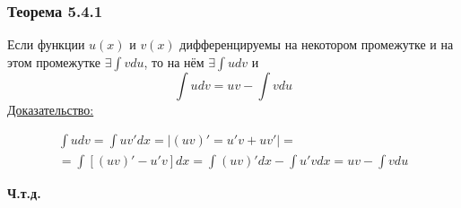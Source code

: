 \documentclass[12pt]{article}
\begin{document}
    \subsubsection*{Теорема 5.4.1}\label{th:5.4.1}
    Если функции $u(x)$ и $v(x)$ дифференцируемы на некотором промежутке и на этом промежутке $\exists \int vdu$, то на нём $\exists \int udv$ и
    \[ \boxed{\int udv = uv - \int vdu} \]
    \underline{Доказательство:}
    \begin{adjustwidth}{1.5em}{1.5em}
        \begin{gather*}
            \int udv = \int uv'dx = \left| (uv)' = u'v + uv' \right| =\\
            = \int [(uv)' - u'v]dx = \int (uv)'dx - \int u'vdx = uv - \int vdu
        \end{gather*}
        \begin{center}
            \textbf{Ч.т.д.}
        \end{center}
    \end{adjustwidth}
\end{document}
